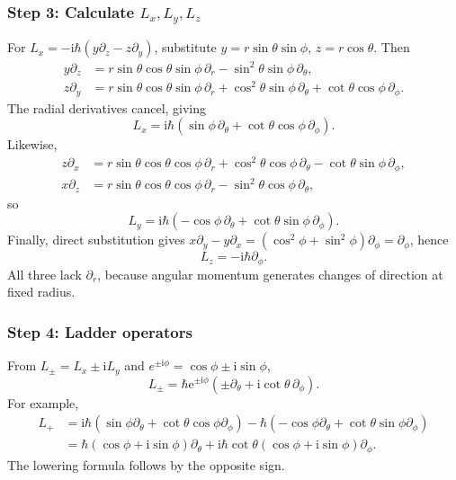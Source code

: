 \documentclass[11pt,a4paper]{article}
\newcommand{\iu}{\mathrm{i}}
\newcommand{\ee}{\mathrm{e}}
\newcommand{\p}{\partial}
\begin{document}
\subsubsection*{Step 3: Calculate \texorpdfstring{$L_x,L_y,L_z$}{Lx Ly Lz}}
For \(L_x=-\iu\hbar(y\p_z-z\p_y)\), substitute \(y=r\sin\theta\sin\phi\), \(z=r\cos\theta\). Then
\begin{align}
y\p_z&=r\sin\theta\cos\theta\sin\phi\,\p_r-\sin^2\theta\sin\phi\,\p_\theta,\\
z\p_y&=r\sin\theta\cos\theta\sin\phi\,\p_r+\cos^2\theta\sin\phi\,\p_\theta+\cot\theta\cos\phi\,\p_\phi.
\end{align}
The radial derivatives cancel, giving
\begin{equation}\boxed{L_x=\iu\hbar(\sin\phi\,\p_\theta+\cot\theta\cos\phi\,\p_\phi).}\end{equation}
Likewise,
\begin{align}
z\p_x&=r\sin\theta\cos\theta\cos\phi\,\p_r+\cos^2\theta\cos\phi\,\p_\theta-\cot\theta\sin\phi\,\p_\phi,\\
x\p_z&=r\sin\theta\cos\theta\cos\phi\,\p_r-\sin^2\theta\cos\phi\,\p_\theta,
\end{align}
so
\begin{equation}\boxed{L_y=\iu\hbar(-\cos\phi\,\p_\theta+\cot\theta\sin\phi\,\p_\phi).}\end{equation}
Finally, direct substitution gives \(x\p_y-y\p_x=(\cos^2\phi+\sin^2\phi)\p_\phi=\p_\phi\), hence
\begin{equation}\boxed{L_z=-\iu\hbar\p_\phi.}\end{equation}
All three lack \(\p_r\), because angular momentum generates changes of direction at fixed radius.

\subsubsection*{Step 4: Ladder operators}
From \(L_\pm=L_x\pm\iu L_y\) and \(e^{\pm\iu\phi}=\cos\phi\pm\iu\sin\phi\),
\begin{equation}\boxed{L_\pm=\hbar\ee^{\pm\iu\phi}\left(\pm\p_\theta+\iu\cot\theta\,\p_\phi\right).}\end{equation}
For example,
\begin{align}
L_+&=\iu\hbar(\sin\phi\p_\theta+\cot\theta\cos\phi\p_\phi)-\hbar(-\cos\phi\p_\theta+\cot\theta\sin\phi\p_\phi)\\
&=\hbar(\cos\phi+\iu\sin\phi)\p_\theta+\iu\hbar\cot\theta(\cos\phi+\iu\sin\phi)\p_\phi.
\end{align}
The lowering formula follows by the opposite sign.
\end{document}
